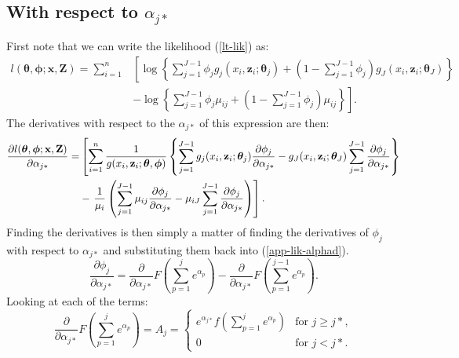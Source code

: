 \subsection{With respect to $\alpha_{j*}$}

First note that we can write the likelihood (\ref{lt-lik}) as:
\begin{align*}
l(\bm{\theta},\bm{\phi}; \mathbf{x},\mathbf{Z}) = \sum_{i=1}^n  & \left [ \log \left \{ \sum_{j=1}^{J-1} \phi_j g_j(x_i,\mathbf{z}_i; \bm{\theta}_j) + \left (1-\sum_{j=1}^{J-1} \phi_j \right ) g_J(x_i,\mathbf{z}_i; \bm{\theta}_J) \right \} \right. \\
& \left. - \log \left \{ \sum_{j=1}^{J-1} \phi_j \mu_{ij} + \left (1-\sum_{j=1}^{J-1} \phi_j \right ) \mu_{ij}  \right \} \right ].
\end{align*}
The derivatives with respect to the $\alpha_{j*}$ of this expression are then:
\begin{align}
\frac{\partial l(\bm{\theta},\bm{\phi}; \mathbf{x},\mathbf{Z})}{\partial \alpha_{j*}} = & \left [ \sum_{i=1}^n \frac{1}{g(x_i,\mathbf{z}_i; \bm{\theta},\bm{\phi})} \left \{ \sum_{j=1}^{J-1} g_j(x_i,\mathbf{z}_i; \bm{\theta}_j) \frac{\partial \phi_j}{\partial \alpha_{j*}}  -g_J(x_i,\mathbf{z}_i; \bm{\theta}_J) \sum_{j=1}^{J-1}  \frac{\partial \phi_j}{\partial \alpha_{j*}} \right \} \right. \notag \\
&- \left. \frac{1}{\mu_i} \left (\sum_{j=1}^{J-1} \mu_{ij} \frac{\partial \phi_j}{\partial \alpha_{j*}} - \mu_{iJ} \sum_{j=1}^{J-1}   \frac{\partial \phi_j}{\partial \alpha_{j*}} \right ) \right ]. \label{app-lik-alphad}
\end{align}
Finding the derivatives is then simply a matter of finding the derivatives of $\phi_{j}$ with respect to $\alpha_{j*}$ and substituting them back into (\ref{app-lik-alphad}).
\begin{equation*}
\frac{\partial \phi_j}{\partial \alpha_{j*}} = \frac{\partial}{\partial \alpha_{j*}}F \left (\sum_{p=1}^j e^{\alpha_p} \right ) - \frac{\partial}{\partial \alpha_{j*}} F \left (\sum_{p=1}^{j-1} e^{\alpha_p} \right ).
\end{equation*}
Looking at each of the terms:
\begin{equation*}
\frac{\partial}{\partial \alpha_{j*}} F \left (\sum_{p=1}^j e^{\alpha_p} \right )=A_{j}=\begin{cases}
e^{\alpha_{j*}}f \left (\sum_{p=1}^j e^{\alpha_p} \right )& \text{for $j\geq j*$},\\
0 & \text{for $j<j*$}.
\end{cases}
\end{equation*}
